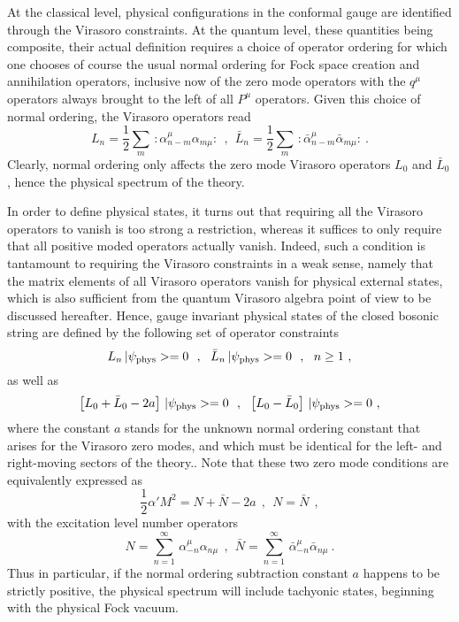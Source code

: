 \documentclass[a4paper,11pt]{article}
\begin{document}
\vspace{10pt}

At the classical level, physical configurations in the conformal gauge
are identified through the Virasoro constraints. At the quantum level,
these quantities being composite, their actual definition requires a choice
of operator ordering for which one chooses of course the usual normal
ordering for Fock space creation and annihilation ope\-ra\-tors, inclusive
now of the zero mode ope\-ra\-tors with the $q^\mu$ operators always brought
to the left of all $P^\mu$ operators. Given this choice of normal ordering,
the Virasoro operators read
\begin{equation}
L_n=\frac{1}{2}\sum_m\,:\alpha^\mu_{n-m}\alpha_{m\mu}:\ \ ,\ \ 
\bar{L}_n=\frac{1}{2}\sum_m\,:\bar{\alpha}^\mu_{n-m}\bar{\alpha}_{m\mu}:\ .
\end{equation}
Clearly, normal ordering only affects the zero mode Virasoro operators
$L_0$ and $\bar{L}_0$, hence the physical spectrum of the theory.

In order to define physical states, it turns out that requiring all the
Virasoro operators to vanish is too strong a restriction, whereas it
suffices to only require that all positive moded operators actually vanish.
Indeed, such a condition is tantamount to requiring the Virasoro constraints
in a weak sense, namely that the matrix elements of all Virasoro operators
vanish for physical external states, which is also sufficient from the quantum
Virasoro algebra point of view to be discussed hereafter. Hence, gauge
invariant physical states of the closed bosonic string are defined by the
following set of operator constraints
\begin{equation}
L_n\,|\psi_{\rm phys}>=0\ \ ,\ \ 
\bar{L}_n\,|\psi_{\rm phys}>=0\ \ ,\ \ n\ge 1\ ,
\end{equation}
as well as
\begin{equation}
\left[L_0+\bar{L}_0-2a\right]\,|\psi_{\rm phys}>=0\ \ ,\ \ 
\left[L_0-\bar{L}_0\right]\,|\psi_{\rm phys}>=0\ ,
\end{equation}
where the constant $a$ stands for the unknown normal ordering constant
that arises for the Virasoro zero modes, and which must be identical for
the left- and right-moving sectors of the theory.. Note that these two
zero mode conditions are equivalently expressed as
\begin{equation}
\frac{1}{2}\alpha' M^2=N+\bar{N}-2a\ \ ,\ \ N=\bar{N}\ \ ,
\end{equation}
with the excitation level number operators
\begin{equation}
N=\sum_{n=1}^\infty\,\alpha^\mu_{-n}\alpha_{n\mu}\ \ ,\ \ 
\bar{N}=\sum_{n=1}^\infty\,\bar{\alpha}^\mu_{-n}\bar{\alpha}_{n\mu}\ .
\end{equation}
Thus in particular, if the normal ordering subtraction constant $a$
happens to be strictly positive, the physical spectrum will include tachyonic
states, beginning with the physical Fock vacuum. 
\end{document}

